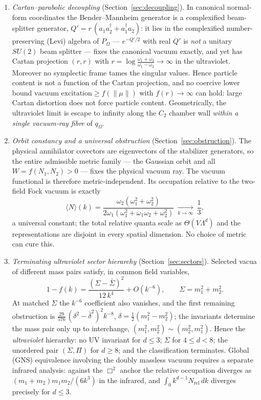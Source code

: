 \documentclass[11pt]{article}
\theoremstyle{definition}
\theoremstyle{remark}
\newcommand{\w}{\omega}
\newcommand{\dg}{\dagger}
\begin{document}
\begin{enumerate}
\item \emph{Cartan--parabolic decoupling}
(Section~\ref{sec:decoupling}).  In canonical normal-form coordinates the
Bender--Mannheim generator is a complexified beam-splitter generator,
$Q'=r\,(a_1a_2^{\dg}+a_1^{\dg}a_2)$: it lies in the complexified
number-preserving (Levi) algebra of $P_\Omega$ --- $e^{-Q'/2}$ with real
$Q'$ is \emph{not} a unitary $SU(2)$ beam splitter --- fixes the
canonical vacuum exactly, and yet has Cartan projection $(r,r)$ with
$r=\log\frac{\w_1+\w_2}{\w_1-\w_2}\to\infty$ in the ultraviolet.
Moreover no symplectic frame tames the singular values.  Hence particle
content is not a function of the Cartan projection, and no coercive
lower bound $\text{vacuum excitation}\ge f(\|\mu\|)$ with
$f(r)\to\infty$ can hold: large Cartan distortion does not force
particle content.  Geometrically, the ultraviolet limit is escape to
infinity along the $C_2$ chamber wall \emph{within a single vacuum-ray
fibre} of $q_\Omega$.

\item \emph{Orbit constancy and a universal obstruction}
(Section~\ref{sec:obstruction}).  The physical annihilator covectors are
eigenvectors of the stabilizer generators, so the entire admissible
metric family --- the Gaussian orbit and all $W=f(N_1,N_2)>0$ ---
fixes the physical vacuum ray.  The vacuum functional is therefore
metric-independent.  Its occupation relative to the two-field Fock vacuum
is exactly
\begin{equation}\label{eq:N}
\langle N\rangle(k)
=\frac{\w_2(\w_1^2+\w_2^2)}{2\w_1(\w_1^2+\w_1\w_2+\w_2^2)}
\ \xrightarrow[k\to\infty]{}\ \frac13 ,
\end{equation}
a universal constant; the total relative quanta scale as
$\Theta(V\Lambda^d)$ and the representations are disjoint in every
spatial dimension.  No choice of metric can cure this.

\item \emph{Terminating ultraviolet sector hierarchy}
(Section~\ref{sec:sectors}).  Selected vacua of different mass pairs
satisfy, in common field variables,
\begin{equation}\label{eq:sector}
1-f(k)=\frac{(\Sigma-\bar\Sigma)^2}{12\,k^4}+O(k^{-6}),
\qquad \Sigma=m_1^2+m_2^2 .
\end{equation}
At matched $\Sigma$ the $k^{-6}$ coefficient also vanishes, and the
first remaining obstruction is
$\tfrac{29}{576}\,(\delta^2-\bar\delta^2)^2k^{-8}$,
$\delta=\tfrac12(m_1^2-m_2^2)$; the invariants determine the mass pair
only up to interchange, $(m_1^2,m_2^2)\sim(m_2^2,m_1^2)$.  Hence the
\emph{ultraviolet} hierarchy: no UV invariant for $d\le3$; $\Sigma$
for $4\le d<8$; the unordered pair $(\Sigma,\Pi)$ for $d\ge8$; and the
classification terminates.  Global (GNS) equivalence involving the
doubly massless vacuum requires a separate infrared analysis: against
the $\Box^2$ anchor the relative occupation diverges as
$(m_1{+}m_2)m_1m_2/(6k^3)$ in the infrared, and
$\int_0k^{d-1}N_{\mathrm{rel}}\,dk$ diverges precisely for $d\le3$.


\end{enumerate}
\end{document}
